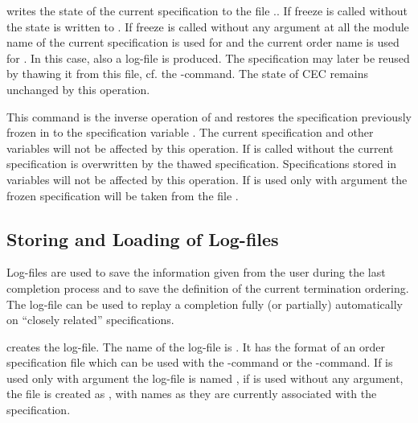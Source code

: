 \begin{command}
writes the state of the current specification to the file
..
If freeze is called without  the state is written
to .
If freeze is called without any argument at all the module name of the current 
specification is used for  and the current order name
is used for .
In this case, also a log-file is produced.
The specification may later be reused by thawing it from this file, cf. the 
-command.
The state of CEC remains unchanged by this operation.
\end{command}

\begin{command}
This command is the inverse operation of  and restores the specification
previously frozen in 
to the specification variable . The current specification and other variables 
will not be affected by this operation.
If  is called without  
the current specification is overwritten by the thawed specification. 
Specifications stored in variables will not be affected by this operation.
If  is used only with argument  the frozen 
specification will be taken from the file .
\end{command}

\subsection{Storing and Loading of Log-files}
\label{StorelogCommand}
\label{LoadlogCommand}

Log-files are used to save the information given from the user during the last
completion process and to save the definition of the current termination
ordering. The log-file can be used to replay a completion fully (or partially)
automatically on ``closely related'' specifications. \bigskip

\begin{command}
creates the log-file.
The name of the log-file is 
.
It has the format of an order specification file which can be used
with the -command or the -command. 
If  is used only with argument 
the log-file is named ,
if  is used without any argument, the file is
created as ,
with names as they are currently associated with the specification.
\end{command}

